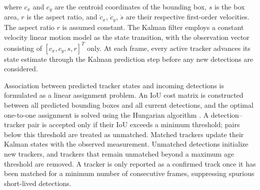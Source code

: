 \noindent where $c_x$ and $c_y$ are the centroid coordinates of the bounding box, $s$ is the box area, $r$ is the aspect ratio, and $\dot{c}_x$, $\dot{c}_y$, $\dot{s}$ are their respective first-order velocities. The aspect ratio $r$ is assumed constant. The Kalman filter employs a constant velocity linear motion model as the state transition, with the observation vector consisting of $[c_x, c_y, s, r]^T$ only. At each frame, every active tracker advances its state estimate through the Kalman prediction step before any new detections are considered.

Association between predicted tracker states and incoming detections is formulated as a linear assignment problem. An IoU cost matrix is constructed between all predicted bounding boxes and all current detections, and the optimal one-to-one assignment is solved using the Hungarian algorithm \cite{bewley2016}. A detection–tracker pair is accepted only if their IoU exceeds a minimum threshold; pairs below this threshold are treated as unmatched. Matched trackers update their Kalman states with the observed measurement. Unmatched detections initialize new trackers, and trackers that remain unmatched beyond a maximum age threshold are removed. A tracker is only reported as a confirmed track once it has been matched for a minimum number of consecutive frames, suppressing spurious short-lived detections.

